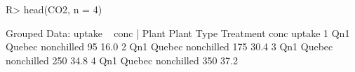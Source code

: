 \begin{Schunk}
% --begin: "pbld1"
\begin{Sinput}
R> head(CO2, n = 4)
\end{Sinput}
\begin{Soutput}
Grouped Data: uptake ~ conc | Plant
  Plant   Type  Treatment conc uptake
1   Qn1 Quebec nonchilled   95   16.0
2   Qn1 Quebec nonchilled  175   30.4
3   Qn1 Quebec nonchilled  250   34.8
4   Qn1 Quebec nonchilled  350   37.2
\end{Soutput}
%
% --end: "pbld1"
\end{Schunk}
